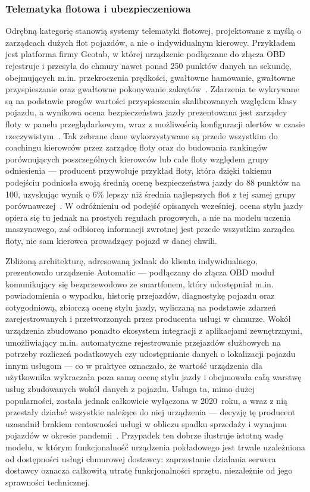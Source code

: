 \subsubsection{Telematyka flotowa i ubezpieczeniowa}

Odrębną kategorię stanowią systemy telematyki flotowej, projektowane z myślą
o zarządcach dużych flot pojazdów, a nie o indywidualnym kierowcy. Przykładem jest
platforma firmy Geotab, w której urządzenie podłączane do złącza OBD rejestruje
i przesyła do chmury nawet ponad 250 punktów danych na sekundę, obejmujących
m.in. przekroczenia prędkości, gwałtowne hamowanie, gwałtowne przyspieszanie oraz
gwałtowne pokonywanie zakrętów~\cite{geotab}. Zdarzenia te wykrywane są na podstawie
progów wartości przyspieszenia skalibrowanych względem klasy pojazdu, a wynikowa ocena
bezpieczeństwa jazdy prezentowana jest zarządcy floty w panelu przeglądarkowym, wraz
z możliwością konfiguracji alertów w czasie rzeczywistym~\cite{geotab}. Tak zebrane dane
wykorzystywane są przede wszystkim do coachingu kierowców przez zarządcę floty oraz do
budowania rankingów porównujących poszczególnych kierowców lub całe floty względem
grupy odniesienia --- producent przywołuje przykład floty, która dzięki takiemu
podejściu podniosła swoją średnią ocenę bezpieczeństwa jazdy do 88 punktów na 100,
uzyskując wynik o 6\% lepszy niż średnia najlepszych flot z tej samej grupy
porównawczej~\cite{geotab}. W odróżnieniu od podejść opisanych wcześniej, ocena stylu
jazdy opiera się tu jednak na prostych regułach progowych, a nie na modelu uczenia
maszynowego, zaś odbiorcą informacji zwrotnej jest przede wszystkim zarządca floty,
nie sam kierowca prowadzący pojazd w danej chwili.

Zbliżoną architekturę, adresowaną jednak do klienta indywidualnego, prezentowało
urządzenie Automatic --- podłączany do złącza OBD moduł komunikujący się bezprzewodowo
ze smartfonem, który udostępniał m.in. powiadomienia o wypadku, historię przejazdów,
diagnostykę pojazdu oraz cotygodniową, zbiorczą ocenę stylu jazdy, wyliczaną na
podstawie zdarzeń zarejestrowanych i przetworzonych przez producenta usługi w chmurze.
Wokół urządzenia zbudowano ponadto ekosystem integracji z aplikacjami zewnętrznymi,
umożliwiający m.in. automatyczne rejestrowanie przejazdów służbowych na potrzeby
rozliczeń podatkowych czy udostępnianie danych o lokalizacji pojazdu innym usługom ---
co w praktyce oznaczało, że wartość urządzenia dla użytkownika wykraczała poza samą
ocenę stylu jazdy i obejmowała całą warstwę usług zbudowanych wokół danych z pojazdu.
Usługa ta, mimo dużej popularności, została jednak całkowicie wyłączona w 2020~roku,
a wraz z nią przestały działać wszystkie należące do niej urządzenia --- decyzję tę
producent uzasadnił brakiem rentowności usługi w obliczu spadku sprzedaży i wynajmu
pojazdów w okresie pandemii~\cite{automaticlabs}. Przypadek ten dobrze ilustruje istotną
wadę modelu, w którym funkcjonalność urządzenia pokładowego jest trwale uzależniona od
dostępności usługi chmurowej dostawcy: zaprzestanie działania serwera dostawcy oznacza
całkowitą utratę funkcjonalności sprzętu, niezależnie od jego sprawności technicznej.


